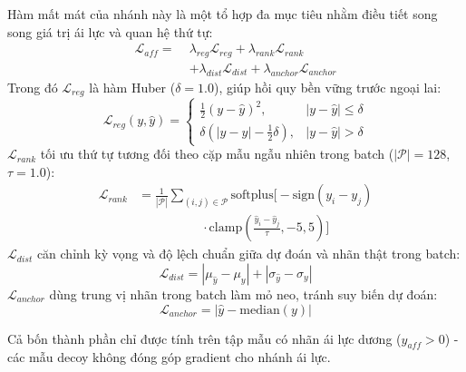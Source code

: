 Hàm mất mát của nhánh này là một tổ hợp đa mục tiêu nhằm điều tiết song song giá trị ái lực và quan hệ thứ tự:
\begin{equation}
\begin{aligned}
    \mathcal{L}_{aff} = \;&\lambda_{reg}\mathcal{L}_{reg} + \lambda_{rank}\mathcal{L}_{rank} \\
    &+ \lambda_{dist}\mathcal{L}_{dist} + \lambda_{anchor}\mathcal{L}_{anchor}
\end{aligned}
\label{eq:laff}
\end{equation}
Trong đó $\mathcal{L}_{reg}$ là hàm Huber ($\delta=1.0$), giúp hồi quy bền vững trước ngoại lai:
\begin{equation}
    \mathcal{L}_{reg}(y,\hat{y}) =
    \begin{cases}
    \frac{1}{2}(y-\hat{y})^2, & |y-\hat{y}| \le \delta \\
    \delta\!\left(|y-\hat{y}| - \frac{1}{2}\delta\right), & |y-\hat{y}| > \delta
    \end{cases}
    \label{eq:lreg}
\end{equation}
$\mathcal{L}_{rank}$ tối ưu thứ tự tương đối theo cặp mẫu ngẫu nhiên trong batch ($|\mathcal{P}|=128$, $\tau=1.0$):
\begin{equation}
    \begin{aligned}
        \mathcal{L}_{rank} &= \frac{1}{|\mathcal{P}|}\sum_{(i,j)\in\mathcal{P}} \mathrm{softplus}\Big[ -\mathrm{sign}(y_i-y_j) \\
        &\qquad\qquad\quad \cdot \mathrm{clamp}\!\left(\frac{\hat{y}_i-\hat{y}_j}{\tau},-5,5\right)\Big]
    \end{aligned}
    \label{eq:lrank}
\end{equation}
$\mathcal{L}_{dist}$ căn chỉnh kỳ vọng và độ lệch chuẩn giữa dự đoán và nhãn thật trong batch:
\begin{equation}
    \mathcal{L}_{dist} = |\mu_{\hat{y}} - \mu_y| + |\sigma_{\hat{y}} - \sigma_y|
    \label{eq:ldist}
\end{equation}
$\mathcal{L}_{anchor}$ dùng trung vị nhãn trong batch làm mỏ neo, tránh suy biến dự đoán:
\begin{equation}
    \mathcal{L}_{anchor} = \left|\hat{y} - \mathrm{median}(y)\right|
    \label{eq:lanchor}
\end{equation}

Cả bốn thành phần chỉ được tính trên tập mẫu có nhãn ái lực dương ($y_{aff} > 0$) - các mẫu decoy không đóng góp gradient cho nhánh ái lực.

